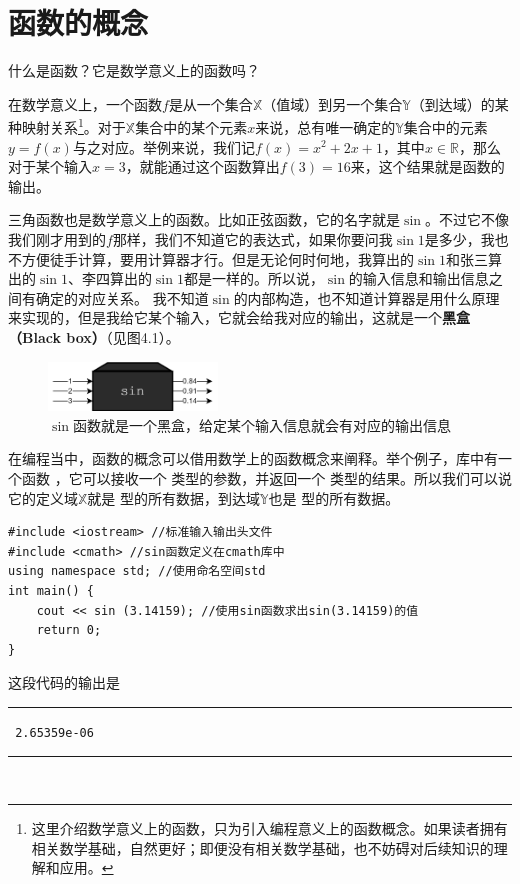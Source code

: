 \section{函数的概念}
什么是函数？它是数学意义上的函数吗？\par
在数学意义上，一个函数$f$是从一个集合$\mathbb{X}$（值域）到另一个集合$\mathbb{Y}$（到达域）的某种映射关系\footnote{这里介绍数学意义上的函数，只为引入编程意义上的函数概念。如果读者拥有相关数学基础，自然更好；即便没有相关数学基础，也不妨碍对后续知识的理解和应用。}。对于$\mathbb{X}$集合中的某个元素$x$来说，总有唯一确定的$\mathbb{Y}$集合中的元素$y=f(x)$与之对应。举例来说，我们记$f(x)=x^2+2x+1$，其中$x\in\mathbb{R}$，那么对于某个输入$x=3$，就能通过这个函数算出$f(3)=16$来，这个结果就是函数的输出。\par
三角函数也是数学意义上的函数。比如正弦函数，它的名字就是$\sin$。不过它不像我们刚才用到的$f$那样，我们不知道它的表达式，如果你要问我$\sin1$是多少，我也不方便徒手计算，要用计算器才行。但是无论何时何地，我算出的$\sin1$和张三算出的$\sin1$、李四算出的$\sin1$都是一样的。所以说，$\sin$的输入信息和输出信息之间有确定的对应关系。
我不知道$\sin$的内部构造，也不知道计算器是用什么原理来实现的，但是我给它某个输入，它就会给我对应的输出，这就是一个\textbf{黑盒（Black box）}（见图4.1）。\par
\begin{figure}[htbp]
    \centering
    \includegraphics[width=0.4\textwidth]{../images/generalized_parts/04_black_box_300.png}
    \caption{$\sin$函数就是一个黑盒，给定某个输入信息就会有对应的输出信息}
\end{figure}
在编程当中，函数的概念可以借用数学上的函数概念来阐释。举个例子，\lstinline@cmath@ 库中有一个函数 \lstinline@sin@，它可以接收一个 \lstinline@double@ 类型的参数，并返回一个 \lstinline@double@ 类型的结果。所以我们可以说它的定义域$\mathbb{X}$就是 \lstinline@double@ 型的所有数据，到达域$\mathbb{Y}$也是 \lstinline@double@ 型的所有数据。\par
\begin{lstlisting}
#include <iostream> //标准输入输出头文件
#include <cmath> //sin函数定义在cmath库中
using namespace std; //使用命名空间std
int main() {
    cout << sin (3.14159); //使用sin函数求出sin(3.14159)的值
    return 0;
}
\end{lstlisting}
这段代码的输出是\\\noindent\rule{\textwidth}{0.2pt}\texttt{
2.65359e-06
}\\\noindent\rule{\textwidth}{0.2pt}\\
